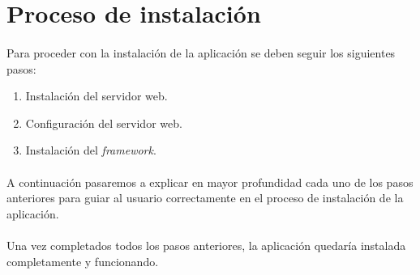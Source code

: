 \section{Proceso de instalación}\label{instalacion}

  \paragraph{}Para proceder con la instalación de la aplicación se deben seguir
  los siguientes pasos:

  \begin{enumerate}
   \item Instalación del servidor web.
   \item Configuración del servidor web.
   \item Instalación del \textit{framework}.
  \end{enumerate}

  \paragraph{}A continuación pasaremos a explicar en mayor profundidad cada
  uno de los pasos anteriores para guiar al usuario correctamente en el proceso
  de instalación de la aplicación.

  \begin{enumerate}
    
    
    
  \end{enumerate}

  \paragraph{}Una vez completados todos los pasos anteriores, la aplicación
  quedaría instalada completamente y funcionando.